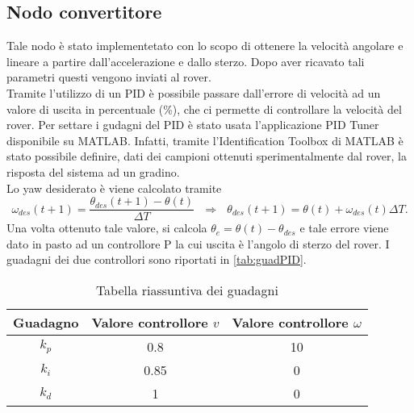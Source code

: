 \subsection{Nodo convertitore}
Tale nodo è stato implementetato con lo scopo di ottenere la velocità angolare e lineare a partire dall'accelerazione e dallo sterzo. Dopo aver ricavato tali parametri questi vengono inviati al rover.\\
Tramite l'utilizzo di un PID è possibile passare dall'errore di velocità ad un valore di uscita in percentuale (\%), che ci permette di controllare la velocità del rover. Per settare i gudagni del PID è stato usata l'applicazione PID Tuner disponibile su MATLAB. Infatti, tramite l'Identification Toolbox di MATLAB è stato possibile definire, dati dei campioni ottenuti sperimentalmente dal rover, la risposta del sistema ad un gradino.\\
Lo yaw desiderato è viene calcolato tramite
\begin{equation}
\omega_{des}(t+1)=\frac{\theta_{des}(t+1)-\theta(t)}{\Delta{T}} \ \ \
\Rightarrow \ \ \ \theta_{des}(t+1)=\theta(t)+\omega_{des}(t)\Delta{T}.
\end{equation} 
Una volta ottenuto tale valore, si calcola $ \theta_e = \theta(t) - \theta_{des} $ e tale errore viene dato in pasto ad un controllore P la cui uscita è l'angolo di sterzo del rover.
I guadagni dei due controllori sono riportati in \autoref{tab:guadPID}.
\begin{table} [H]
    \centering
    \begin{tabular}{|ccc|}
    \hline
        Guadagno & Valore controllore $v$ & Valore controllore $\omega$ \\  \hline
        $k_p$ & 0.8  & 10\\  \hline
        $k_i$ & 0.85 & 0 \\  \hline
        $k_d$ & 1    & 0 \\  \hline
    \end{tabular}
    \caption{Tabella riassuntiva dei guadagni}
    \label{tab:guadPID}    
\end{table}





